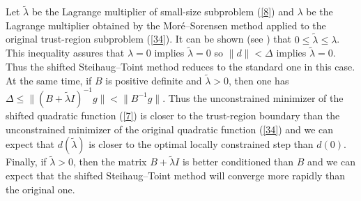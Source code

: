\documentclass{esub2acm}
\begin{document}
\noindent Let $\tilde\lambda$ be the Lagrange multiplier of small-size
subproblem (\ref{8}) and $\lambda$ be the Lagrange multiplier obtained by the
Mor\'{e}--Sorensen method applied to the original trust-region subproblem (\ref{34}).
It can be shown (see \cite{lmv1}) that $0 \leq \tilde{\lambda} \leq \lambda$.
This inequality assures that $\lambda = 0$ implies $\tilde{\lambda} = 0$ so
$\|d\| < \Delta$ implies $\tilde{\lambda} = 0$. Thus the shifted Steihaug--Toint
method reduces to the standard one in this case. At the same time, if $B$ is
positive definite and $\tilde{\lambda} > 0$, then one has
$\Delta \leq \|(B + \tilde{\lambda}I)^{-1}g\| < \|B^{-1}g\|$. Thus the
unconstrained minimizer of the shifted quadratic function (\ref{7})
is closer to the trust-region boundary than the unconstrained minimizer
of the original quadratic function (\ref{34}) and we can expect that
$d(\tilde{\lambda})$ is closer to the optimal locally constrained step than
$d(0)$. Finally, if $\tilde{\lambda} > 0$, then the matrix $B + \tilde{\lambda}I$
is better conditioned than $B$ and we can expect that the shifted
Steihaug--Toint method will converge more rapidly than the original one.

\vspace{8mm}


\vspace{3mm}
\end{document}
